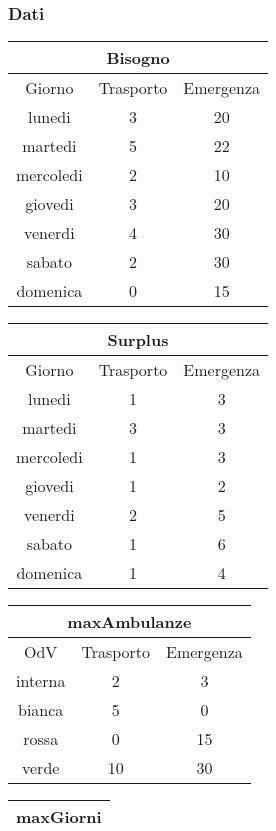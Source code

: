 \subsubsection{Dati}
\begin{center}
\begin{tabular}{|| c || c | c |}
    \hline
    \multicolumn{3}{|c|}{Bisogno}\\
    \hline \hline
    Giorno & Trasporto & Emergenza \\
    \hline
    lunedi & 3 & 20 \\
    martedi & 5 & 22 \\
    mercoledi & 2 & 10 \\
    giovedi & 3 & 20 \\
    venerdi & 4 & 30 \\
    sabato & 2 & 30 \\
    domenica & 0 & 15 \\
    \hline
\end{tabular}
\begin{tabular}{|| c || c | c |}
    \hline
    \multicolumn{3}{|c|}{Surplus}\\
    \hline \hline
    Giorno & Trasporto & Emergenza \\
    \hline
    lunedi & 1 & 3 \\
    martedi & 3 & 3 \\
    mercoledi & 1 & 3 \\
    giovedi & 1 & 2 \\
    venerdi & 2 & 5 \\
    sabato & 1 & 6 \\
    domenica & 1 & 4 \\
    \hline
\end{tabular}
\newline
\begin{tabular}{|| c || c | c |}
    \hline
    \multicolumn{3}{|c|}{maxAmbulanze}\\
    \hline \hline
    OdV & Trasporto & Emergenza \\
    \hline
    interna & 2 & 3 \\
    bianca & 5 & 0 \\
    rossa & 0 & 15 \\
    verde & 10 & 30 \\
    \hline    
\end{tabular}
\begin{tabular}{|| c || c | c |}
    \hline
    \multicolumn{3}{|c|}{maxGiorni}\\
    \hline \hline

\end{tabular}
\end{center}
